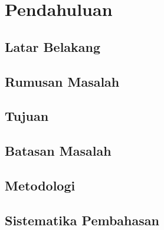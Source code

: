
\chapter{Pendahuluan}

\section{Latar Belakang}

\section{Rumusan Masalah}

\section{Tujuan}

\section{Batasan Masalah}

\section{Metodologi}

\section{Sistematika Pembahasan}
